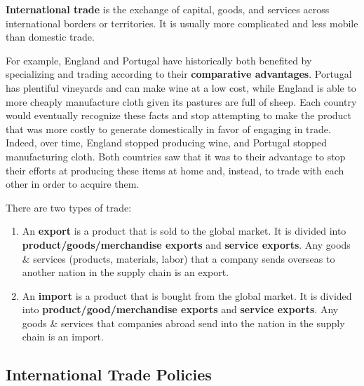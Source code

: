 \documentclass{article}
\begin{document}
    \begin{center}
    \end{center}

    \textbf{International trade} is the exchange of capital, goods, and services across international borders or territories. It is usually more complicated and less mobile than domestic trade.

    For example, England and Portugal have historically both benefited by specializing and trading according to their \textbf{comparative advantages}. Portugal has plentiful vineyards and can make wine at a low cost, while England is able to more cheaply manufacture cloth given its pastures are full of sheep. Each country would eventually recognize these facts and stop attempting to make the product that was more costly to generate domestically in favor of engaging in trade. Indeed, over time, England stopped producing wine, and Portugal stopped manufacturing cloth. Both countries saw that it was to their advantage to stop their efforts at producing these items at home and, instead, to trade with each other in order to acquire them.

    There are two types of trade:
    \begin{enumerate}
      \item An \textbf{export} is a product that is sold to the global market. It is divided into \textbf{product/goods/merchandise exports} and \textbf{service exports}. Any goods \& services (products, materials, labor) that a company sends overseas to another nation in the supply chain is an export.
      \item An \textbf{import} is a product that is bought from the global market. It is divided into \textbf{product/good/merchandise exports} and \textbf{service exports}. Any goods \& services that companies abroad send into the nation in the supply chain is an import.
    \end{enumerate}

  \subsection{International Trade Policies}
\end{document}
